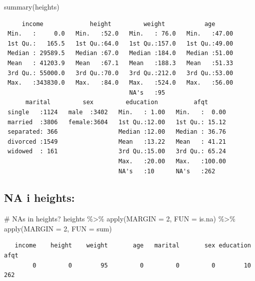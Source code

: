 \documentclass[
  letterpaper,
  DIV=11,
  numbers=noendperiod]{scrartcl}
\newenvironment{Shaded}{\begin{snugshade}}{\end{snugshade}}
\newcommand{\AttributeTok}[1]{\textcolor[rgb]{0.40,0.45,0.13}{#1}}
\newcommand{\CommentTok}[1]{\textcolor[rgb]{0.37,0.37,0.37}{#1}}
\newcommand{\DecValTok}[1]{\textcolor[rgb]{0.68,0.00,0.00}{#1}}
\newcommand{\FunctionTok}[1]{\textcolor[rgb]{0.28,0.35,0.67}{#1}}
\newcommand{\NormalTok}[1]{\textcolor[rgb]{0.00,0.23,0.31}{#1}}
\newcommand{\SpecialCharTok}[1]{\textcolor[rgb]{0.37,0.37,0.37}{#1}}
\begin{document}
\begin{Shaded}
\begin{Highlighting}[]
\FunctionTok{summary}\NormalTok{(heights)}
\end{Highlighting}
\end{Shaded}

\begin{verbatim}
     income             height         weight           age       
 Min.   :     0.0   Min.   :52.0   Min.   : 76.0   Min.   :47.00  
 1st Qu.:   165.5   1st Qu.:64.0   1st Qu.:157.0   1st Qu.:49.00  
 Median : 29589.5   Median :67.0   Median :184.0   Median :51.00  
 Mean   : 41203.9   Mean   :67.1   Mean   :188.3   Mean   :51.33  
 3rd Qu.: 55000.0   3rd Qu.:70.0   3rd Qu.:212.0   3rd Qu.:53.00  
 Max.   :343830.0   Max.   :84.0   Max.   :524.0   Max.   :56.00  
                                   NA's   :95                     
      marital         sex         education          afqt       
 single   :1124   male  :3402   Min.   : 1.00   Min.   :  0.00  
 married  :3806   female:3604   1st Qu.:12.00   1st Qu.: 15.12  
 separated: 366                 Median :12.00   Median : 36.76  
 divorced :1549                 Mean   :13.22   Mean   : 41.21  
 widowed  : 161                 3rd Qu.:15.00   3rd Qu.: 65.24  
                                Max.   :20.00   Max.   :100.00  
                                NA's   :10      NA's   :262     
\end{verbatim}

\hypertarget{na-i-heights}{%
\subsection{NA i heights:}\label{na-i-heights}}

\begin{Shaded}
\begin{Highlighting}[]
\CommentTok{\# NAs in heights?}
\NormalTok{heights }\SpecialCharTok{\%\textgreater{}\%} 
  \FunctionTok{apply}\NormalTok{(}\AttributeTok{MARGIN =} \DecValTok{2}\NormalTok{, }\AttributeTok{FUN =}\NormalTok{ is.na) }\SpecialCharTok{\%\textgreater{}\%} 
  \FunctionTok{apply}\NormalTok{(}\AttributeTok{MARGIN =} \DecValTok{2}\NormalTok{, }\AttributeTok{FUN =}\NormalTok{ sum) }
\end{Highlighting}
\end{Shaded}

\begin{verbatim}
   income    height    weight       age   marital       sex education      afqt 
        0         0        95         0         0         0        10       262 
\end{verbatim}
\end{document}
